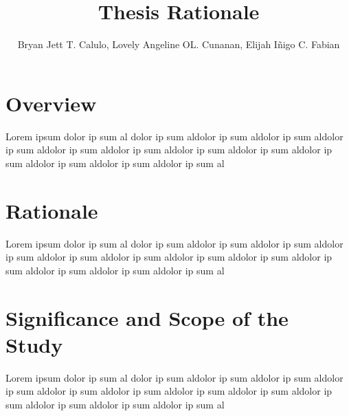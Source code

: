 \documentclass[english,10pt,a4paper]{article}
\title{Thesis Rationale}
\author{Bryan Jett T. Calulo, Lovely Angeline OL. Cunanan, Elijah Iñigo C. Fabian}
\begin{document}
	\maketitle
	
	\section*{Overview}
	Lorem ipsum dolor ip sum al dolor ip sum aldolor ip sum aldolor ip sum aldolor ip sum aldolor ip sum aldolor ip sum aldolor ip sum aldolor ip sum aldolor ip sum aldolor ip sum aldolor ip sum aldolor ip sum al
	
	\section*{Rationale}
	Lorem ipsum dolor ip sum al dolor ip sum aldolor ip sum aldolor ip sum aldolor ip sum aldolor ip sum aldolor ip sum aldolor ip sum aldolor ip sum aldolor ip sum aldolor ip sum aldolor ip sum aldolor ip sum al
	
	\section*{Significance and Scope of the Study}
	Lorem ipsum dolor ip sum al dolor ip sum aldolor ip sum aldolor ip sum aldolor ip sum aldolor ip sum aldolor ip sum aldolor ip sum aldolor ip sum aldolor ip sum aldolor ip sum aldolor ip sum aldolor ip sum al
	
\end{document}
